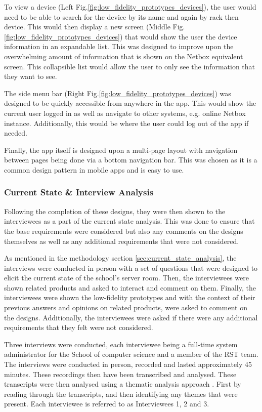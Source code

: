 \documentclass [11pt,a4paper]{article}
\begin{document}
To view a device (Left Fig.\ref{fig:low_fidelity_prototypes_devices}), the user would need to be able to search for the device by its name and again by rack then device. This would then display a new screen (Middle Fig.\ref{fig:low_fidelity_prototypes_devices}) that would show the user the device information in an expandable list. This was designed to improve upon the overwhelming amount of information that is shown on the Netbox equivalent screen. This collapsible list would allow the user to only see the information that they want to see.

The side menu bar (Right Fig.\ref{fig:low_fidelity_prototypes_devices}) was designed to be quickly accessible from anywhere in the app. This would show the current user logged in as well as navigate to other systems, e.g. online Netbox instance. Additionally, this would be where the user could log out of the app if needed.

Finally, the app itself is designed upon a multi-page layout with navigation between pages being done via a bottom navigation bar. This was chosen as it is a common design pattern in mobile apps and is easy to use. 


\subsubsection{Current State \& Interview Analysis}
\label{sec:ui_design_interview_analysis}
Following the completion of these designs, they were then shown to the interviewees as a part of the current state analysis. This was done to ensure that the base requirements were considered but also any comments on the designs themselves as well as any additional requirements that were not considered. 

As mentioned in the methodology section \ref{sec:current_state_analysis}, the interviews were conducted in person with a set of questions that were designed to elicit the current state of the school's server room. Then, the interviewees were shown related products and asked to interact and comment on them. Finally, the interviewees were shown the low-fidelity prototypes and with the context of their previous answers and opinions on related products, were asked to comment on the designs. Additionally, the interviewees were asked if there were any additional requirements that they felt were not considered.

Three interviews were conducted, each interviewee being a full-time system administrator for the School of computer science and a member of the RST team. The interviews were conducted in person, recorded and lasted approximately 45 minutes. These recordings then have been transcribed and analysed. These transcripts were then analysed using a thematic analysis approach \cite{thematicAnal}. First by reading through the transcripts, and then identifying any themes that were present. Each interviewee is referred to as Interviewees 1, 2 and 3. 
\end{document}
